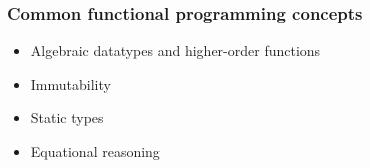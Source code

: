 \documentclass[t]{beamer}
\begin{document}
\begin{frame}[c,fragile]
\frametitle{Common functional programming concepts}
\begin{comment}
This is why, instead of presenting a definition of functional programming and measuring
Rust against it, I'm going cover a few topics that seem most closely associated to
"functional programming" (whatever *that* is), and talk about the extent to which they show
up in Rust.

Before I reveal them, I want to do a poll. What are some of the ideas *you* would include?
\end{comment}

\begin{itemize}
\item Algebraic datatypes and higher-order functions
\item Immutability
\item Static types
\item Equational reasoning
\end{itemize}
\end{frame}
\end{document}
